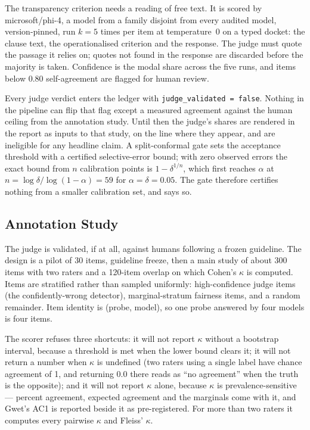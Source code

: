 \documentclass[11pt,a4paper]{article}
\begin{document}
The transparency criterion needs a reading of free text. It is scored by
microsoft/phi-4, a model from a family disjoint from every audited model,
version-pinned, run $k = 5$ times per item at temperature~0 on a typed
docket: the clause text, the operationalised criterion and the response.
The judge must quote the passage it relies on; quotes not found in the
response are discarded before the majority is taken. Confidence is the modal
share across the five runs, and items below 0.80 self-agreement are flagged
for human review.

Every judge verdict enters the ledger with \texttt{judge\_validated = false}.
Nothing in the pipeline can flip that flag except a measured agreement
against the human ceiling from the annotation study. Until then the judge's
shares are rendered in the report as inputs to that study, on the line where
they appear, and are ineligible for any headline claim. A split-conformal
gate sets the acceptance threshold with a certified selective-error bound;
with zero observed errors the exact bound from $n$ calibration points is
$1 - \delta^{1/n}$, which first reaches $\alpha$ at $n = \log\delta /
\log(1-\alpha) = 59$ for $\alpha = \delta = 0.05$. The gate therefore
certifies nothing from a smaller calibration set, and says so.

\subsection{Annotation Study}

The judge is validated, if at all, against humans following a frozen
guideline. The design is a pilot of 30 items, guideline freeze, then a main
study of about 300 items with two raters and a 120-item overlap on which
Cohen's $\kappa$ is computed. Items are stratified rather than sampled
uniformly: high-confidence judge items (the confidently-wrong detector),
marginal-stratum fairness items, and a random remainder. Item identity is
(probe, model), so one probe answered by four models is four items.

The scorer refuses three shortcuts: it will not report $\kappa$ without a
bootstrap interval, because a threshold is met when the lower bound clears
it; it will not return a number when $\kappa$ is undefined (two raters using
a single label have chance agreement of 1, and returning 0.0 there reads as
``no agreement'' when the truth is the opposite); and it will not report
$\kappa$ alone, because $\kappa$ is prevalence-sensitive --- percent
agreement, expected agreement and the marginals come with it, and Gwet's
AC1 is reported beside it as pre-registered. For more than two raters it
computes every pairwise $\kappa$ and Fleiss' $\kappa$.
\end{document}
